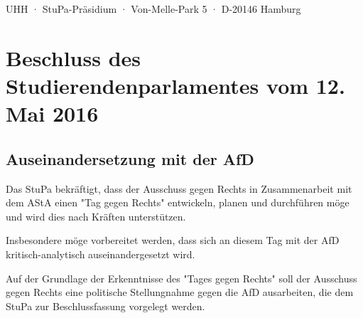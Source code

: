 \documentclass[ngerman,headheight=70pt]{scrartcl}
\begin{document}
    UHH · StuPa-Präsidium · Von-Melle-Park 5 · D-20146 Hamburg

    \section*{Beschluss des Studierendenparlamentes vom 12. Mai 2016}
    \subsection*{Auseinandersetzung mit der AfD}

    Das StuPa bekräftigt, dass der Ausschuss gegen Rechts in Zusammenarbeit
    mit dem AStA einen "Tag gegen Rechts" entwickeln, planen und durchführen
    möge und wird dies nach Kräften unterstützen.

    Insbesondere möge vorbereitet werden, dass sich an diesem Tag mit der AfD
    kritisch-analytisch auseinandergesetzt wird.

    Auf der Grundlage der Erkenntnisse des "Tages gegen Rechts" soll der Ausschuss
    gegen Rechts eine politische Stellungnahme gegen die AfD ausarbeiten, die
    dem StuPa zur Beschlussfassung vorgelegt werden.
\end{document}

